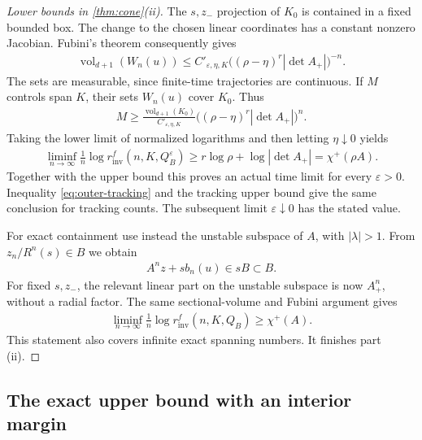 \documentclass[11pt,a4paper]{article}
\theoremstyle{definition}
\theoremstyle{remark}
\begin{document}
\begin{proof}[Lower bounds in \cref{thm:cone}(ii)]
The \(s,z_-\) projection of \(K_0\) is contained in a fixed bounded box. The change to the chosen linear coordinates has a constant nonzero Jacobian. Fubini's theorem consequently gives
\begin{align*}
 \operatorname{vol}_{d+1}(W_n(u))\leq
 C'_{\varepsilon,\eta,K}\bigl((\rho-\eta)^r|\det A_+|\bigr)^{-n}.
\end{align*}
The sets are measurable, since finite-time trajectories are continuous. If \(M\) controls span \(K\), their sets \(W_n(u)\) cover \(K_0\). Thus
\begin{align*}
 M\geq \frac{\operatorname{vol}_{d+1}(K_0)}{C'_{\varepsilon,\eta,K}}
          \bigl((\rho-\eta)^r|\det A_+|\bigr)^n.
\end{align*}
Taking the lower limit of normalized logarithms and then letting \(\eta\downarrow0\) yields
\begin{align*}
 \liminf_{n\to\infty}\frac1n
 \log r_{\mathrm{inv}}^{f}(n,K,Q_B^\varepsilon)
 \geq r\log\rho+\log|\det A_+|
 =\chi^+(\rho A).
\end{align*}
Together with the upper bound this proves an actual time limit for every \(\varepsilon>0\). Inequality \eqref{eq:outer-tracking} and the tracking upper bound give the same conclusion for tracking counts. The subsequent limit \(\varepsilon\downarrow0\) has the stated value.

For exact containment use instead the unstable subspace of \(A\), with \(|\lambda|>1\). From \(z_n/R^n(s)\in B\) we obtain
\begin{align*}
 A^nz+s b_n(u)\in sB\subset B.
\end{align*}
For fixed \(s,z_-\), the relevant linear part on the unstable subspace is now \(A_+^n\), without a radial factor. The same sectional-volume and Fubini argument gives
\begin{align*}
 \liminf_{n\to\infty}\frac1n
 \log r_{\mathrm{inv}}^{f}(n,K,Q_B)\geq\chi^+(A).
\end{align*}
This statement also covers infinite exact spanning numbers. It finishes part (ii).
\end{proof}

\subsection{The exact upper bound with an interior margin}
\end{document}
